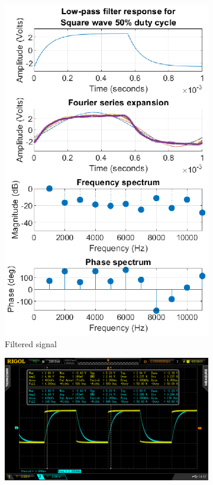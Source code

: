 \documentclass[notitlepage, a4paper, 11pt]{article}
\begin{document}
\begin{figure}[H]
\begin{subfigure}[][][t]{0.26\textwidth}
			\includegraphics[width=\textwidth]{../Matlab/img/RCLPsqr50}
			\caption{Filtered signal}
		\end{subfigure}
		\hfill
		\begin{subfigure}[][][t]{0.45\textwidth}
			\includegraphics[width=\textwidth, trim=85 50 112 45, clip]{../img/osc/DS2_QuickPrint4.png}

\end{subfigure}
\end{figure}
\end{document}
